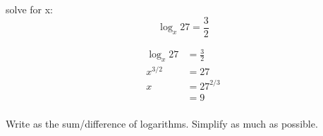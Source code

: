 \documentclass[fleqn,addpoints]{exam}
\begin{document}
\begin{questions}






    \question[5] solve for x:
      \[
        \log_x 27 = \frac{3}{2}
      \]

      \begin{solution}
        \begin{align*}
          \log_x 27 & = \frac{3}{2} \\
          x^{3/2}   & = 27 \\
          x         & = 27^{2/3} \\
                    & = \boxed{9} \\
        \end{align*}
      \end{solution}

    \question Write as the sum/difference of logarithms.  Simplify as much as possible.
\end{questions}
\end{document}
